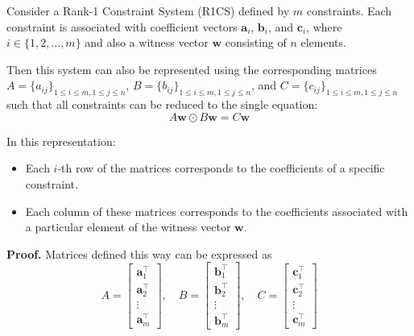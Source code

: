 \documentclass[../lecture-notes-148x210.tex]{subfiles}
\begin{document}
\begin{theorem} 
    Consider a Rank-1 Constraint System (R1CS) defined by $m$ constraints. Each constraint is
    associated with coefficient vectors $\mathbf{a}_i$, $\mathbf{b}_i$, and $\mathbf{c}_i$, where $i \in \{1, 2, \dots, m\}$ and
    also a witness vector $\mathbf{w}$ consisting of $n$ elements.

    Then this system can also be represented using the corresponding matrices 
    $A = \{a_{ij}\}_{1 \leq i \leq m, 1 \leq j \leq n}$, $B = \{b_{ij}\}_{1 \leq i \leq m, 1 \leq j \leq n}$,
    and $C = \{c_{ij}\}_{1 \leq i \leq m, 1 \leq j \leq n}$ such that all constraints can be reduced to
    the single equation:
    \begin{equation*}
        A\mathbf{w} \odot B\mathbf{w} = C\mathbf{w}
    \end{equation*}
    
    In this representation:
    \begin{itemize}
        \item Each $i$-th row of the matrices corresponds to the coefficients of a specific constraint.
        \item Each column of these matrices corresponds to the coefficients associated with a 
        particular element of the witness vector $\mathbf{w}$.
    \end{itemize}
\end{theorem}

\textbf{Proof.} Matrices defined this way can be expressed as
\begin{equation*}
    A = \begin{bmatrix}
        \mathbf{a}_1^{\top} \\ \mathbf{a}_2^{\top} \\ \vdots \\ \mathbf{a}_m^{\top}
    \end{bmatrix}, \quad B = \begin{bmatrix}
        \mathbf{b}_1^{\top} \\ \mathbf{b}_2^{\top} \\ \vdots \\ \mathbf{b}_m^{\top}
    \end{bmatrix}, \quad C = \begin{bmatrix}
        \mathbf{c}_1^{\top} \\ \mathbf{c}_2^{\top} \\ \vdots \\ \mathbf{c}_m^{\top}
    \end{bmatrix}
\end{equation*}
\end{document}
